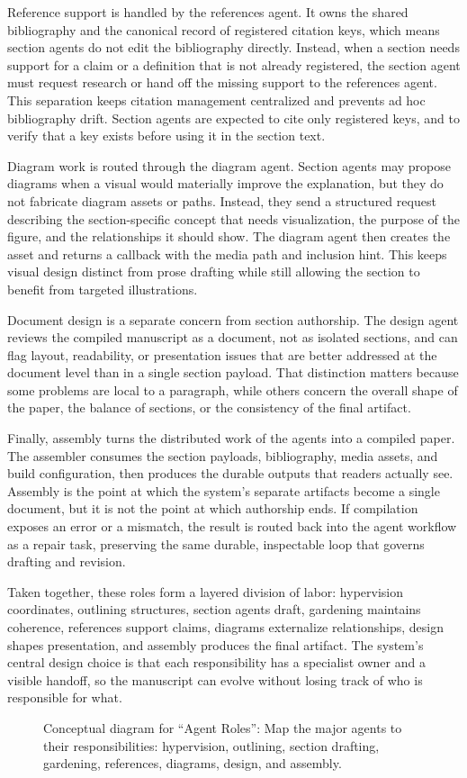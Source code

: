 \documentclass[11pt]{article}
\begin{document}
Reference support is handled by the references agent. It owns the shared bibliography and the canonical record of registered citation keys, which means section agents do not edit the bibliography directly. Instead, when a section needs support for a claim or a definition that is not already registered, the section agent must request research or hand off the missing support to the references agent. This separation keeps citation management centralized and prevents ad hoc bibliography drift. Section agents are expected to cite only registered keys, and to verify that a key exists before using it in the section text.

Diagram work is routed through the diagram agent. Section agents may propose diagrams when a visual would materially improve the explanation, but they do not fabricate diagram assets or paths. Instead, they send a structured request describing the section-specific concept that needs visualization, the purpose of the figure, and the relationships it should show. The diagram agent then creates the asset and returns a callback with the media path and inclusion hint. This keeps visual design distinct from prose drafting while still allowing the section to benefit from targeted illustrations.

Document design is a separate concern from section authorship. The design agent reviews the compiled manuscript as a document, not as isolated sections, and can flag layout, readability, or presentation issues that are better addressed at the document level than in a single section payload. That distinction matters because some problems are local to a paragraph, while others concern the overall shape of the paper, the balance of sections, or the consistency of the final artifact.

Finally, assembly turns the distributed work of the agents into a compiled paper. The assembler consumes the section payloads, bibliography, media assets, and build configuration, then produces the durable outputs that readers actually see. Assembly is the point at which the system's separate artifacts become a single document, but it is not the point at which authorship ends. If compilation exposes an error or a mismatch, the result is routed back into the agent workflow as a repair task, preserving the same durable, inspectable loop that governs drafting and revision.

Taken together, these roles form a layered division of labor: hypervision coordinates, outlining structures, section agents draft, gardening maintains coherence, references support claims, diagrams externalize relationships, design shapes presentation, and assembly produces the final artifact. The system's central design choice is that each responsibility has a specialist owner and a visible handoff, so the manuscript can evolve without losing track of who is responsible for what.

\begin{figure}[htbp]
\centering

\caption{Conceptual diagram for ``Agent Roles'': Map the major agents to their responsibilities: hypervision, outlining, section drafting, gardening, references, diagrams, design, and assembly.}
\end{figure}
\end{document}
